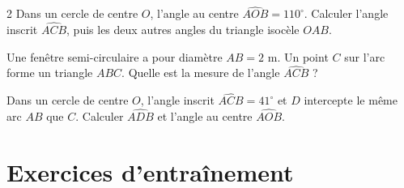 \begin{multicols}{2}
\exo{} Dans un cercle de centre $O$, l'angle au centre $\widehat{AOB}=110^{\circ}$.
Calculer l'angle inscrit $\widehat{ACB}$, puis les deux autres angles du triangle isocèle
$OAB$.

\exo{} Une fenêtre semi-circulaire a pour diamètre $AB=2$ m. Un point $C$ sur l'arc
forme un triangle $ABC$. Quelle est la mesure de l'angle $\widehat{ACB}$ ?

\exo{} Dans un cercle de centre $O$, l'angle inscrit $\widehat{ACB}=41^{\circ}$ et
$D$ intercepte le même arc $AB$ que $C$. Calculer $\widehat{ADB}$ et l'angle au centre
$\widehat{AOB}$.

\end{multicols}

\section{Exercices d'entraînement}
